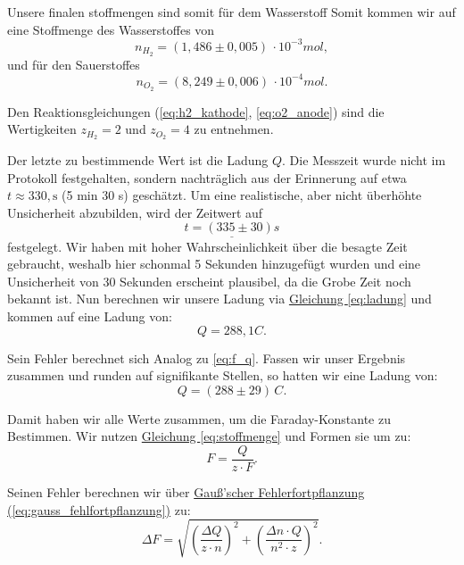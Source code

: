 Unsere finalen stoffmengen sind somit für dem Wasserstoff
Somit kommen wir auf eine Stoffmenge des Wasserstoffes von
\begin{equation}
    \boxed{
        n_{H_2} = (1,486 \pm 0,005) \, \cdot 10^{-3} mol, 
    }
\end{equation}
und für den Sauerstoffes 
\begin{equation}
    \boxed{
        n_{O_2} = (8,249 \pm 0,006) \, \cdot 10^{-4} mol.
    }
\end{equation}

Den Reaktionsgleichungen (\ref{eq:h2_kathode}, \ref{eq:o2_anode}) sind die Wertigkeiten $z_{H_2} = 2$ und $z_{O_2} = 4$ zu entnehmen.

Der letzte zu bestimmende Wert ist die Ladung $Q$. Die Messzeit wurde nicht im Protokoll festgehalten, sondern nachträglich aus der Erinnerung auf etwa $t \approx 330,\text{s}$ (5 min 30 s) geschätzt. Um eine realistische, aber nicht überhöhte Unsicherheit abzubilden, wird der Zeitwert auf 
\begin{equation}
    \underline{t = (335 \pm 30)s}
\end{equation}
festgelegt.
Wir haben mit hoher Wahrscheinlichkeit über die besagte Zeit gebraucht, weshalb hier schonmal 5 Sekunden hinzugefügt wurden und eine Unsicherheit von 30 Sekunden erscheint plausibel, da die Grobe Zeit noch bekannt ist.
Nun berechnen wir unsere Ladung via \hyperref[eq:ladung]{Gleichung \ref*{eq:ladung}} und kommen auf eine Ladung von:
\begin{equation}
    Q = 288,1 C. 
\end{equation}

Sein Fehler berechnet sich Analog zu \ref{eq:f_q}. Fassen wir unser Ergebnis zusammen und runden auf signifikante Stellen, so hatten wir eine Ladung von:
\begin{equation}
    \boxed{Q = (288 \pm 29) \, C}.
\end{equation}

Damit haben wir alle Werte zusammen, um die Faraday-Konstante zu Bestimmen. Wir nutzen \hyperref[eq:stoffmenge]{Gleichung \ref*{eq:stoffmenge}} und Formen sie um zu:
\begin{equation}
    F = \frac{Q}{z \cdot F}.
\end{equation}

Seinen Fehler berechnen wir über \hyperref[eq:gauss_fehlfortpflanzung]{Gauß'scher Fehlerfortpflanzung (\ref*{eq:gauss_fehlfortpflanzung})} zu:
\begin{equation}
    \Delta F = \sqrt{\left(\frac{\Delta Q}{z \cdot n}\right)^2 + \left(\frac{\Delta n \cdot  Q}{n^2 \cdot z}\right)^2}.
\end{equation}

